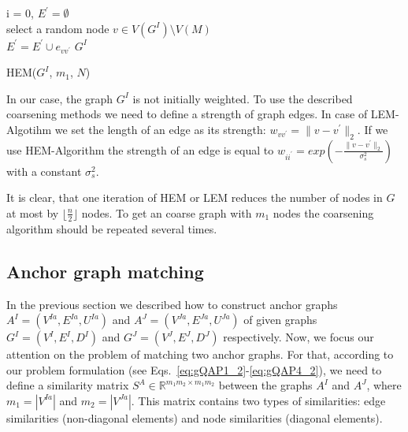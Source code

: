 \begin{algorithm}[h]
	i = 0, $E^\prime=\emptyset$ \\
	{ select a random node $v\in V(G^I)\setminus V(M)$ \\
	  {$E^\prime=E^\prime\cup{e_{vv^\prime}}$}
	}
	\Return $G^I$
	\caption{HEM($G^I$, $m_1$, $N$)} \label{alg:HEM}
\end{algorithm}

In our case, the graph $G^I$ is not initially weighted. To use the described coarsening methods we need to define a strength of graph edges. In case of LEM-Algotihm we set the length of an edge as its strength: $w_{vv^\prime}=\|v-v^\prime\|_{2}$. If we use HEM-Algorithm the strength of an edge is equal to $w_{ii^\prime} = exp(-\frac{\|v-v^\prime\|_{2}}{\sigma^2_{s}})$ with a constant $\sigma^2_{s}$.

It is clear, that one iteration of HEM or LEM reduces the number of nodes in $G$ at most by $\lfloor\frac{n}{2} \rfloor$ nodes. To get an coarse graph with $m_1$ nodes the coarsening algorithm should be repeated several times.

\subsection{Anchor graph matching}
\label{anchorGraphMatching}
In the previous section we described how to construct anchor graphs $A^I=(V^{Ia},E^{Ia},U^{Ia})$ and $A^J=(V^{Ja},E^{Ja},U^{Ja})$ of given graphs $G^I = (V^I, E^I, D^I)$ and $G^J=(V^J, E^J, D^J)$ respectively. Now, we focus our attention on the problem of matching two anchor graphs. For that, according to our problem formulation (see Eqs.~\eqref{eq:gQAP1_2}-\eqref{eq:gQAP4_2}), we need to define a similarity matrix $S^A\in\mathbb{R}^{m_1m_2\times m_1m_2}$ between the graphs $A^I$ and $A^J$, where $m_1=|V^{Ia}|$ and $m_2=|V^{Ja}|$. This matrix contains two types of similarities: edge similarities (non-diagonal elements) and node similarities (diagonal elements).

